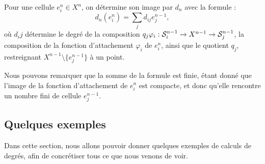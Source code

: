 \bigskip Pour une cellule $e_i^n\in X^n$, on détermine son image par $d_n$ avec la formule : \[d_n(e_i^n)=\sum_{j}d_{ij}e_j^{n-1},\]où ${d_ij}$ détermine le degré de la composition $q_j\varphi_i:\mathcal{S}^{n-1}_i\to X^{n-1}\to\mathcal{S}^{n-1}_j$, la composition de la fonction d'attachement $\varphi_i$ de $e^n_i$, ainsi que le quotient $q_j$, restreignant $X^{n-1}\setminus\{e^{n-1}_j\}$ à un point. 

Nous pouvons remarquer que la somme de la formule est finie, étant donné que l'image de la fonction d'attachement de $e_i^n$ est compacte, et donc qu'elle rencontre un nombre fini de cellule $e_j^{n-1}$.

\subsection{Quelques exemples}

Dans cette section, nous allons pouvoir donner quelques exemples de calculs de degrés, afin de concrétiser tous ce que nous venons de voir.

